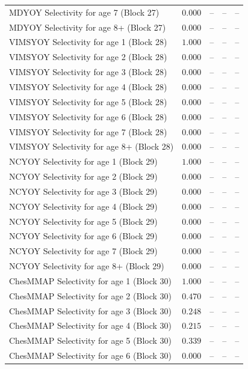 \documentclass[
]{article}
\begin{document}
\begin{landscape}
\begin{longtable}[t]{lrrrr}
\addlinespace
MDYOY Selectivity for age 7 (Block 27) & $0.000$ & -- & -- & --\\
MDYOY Selectivity for age 8+ (Block 27) & $0.000$ & -- & -- & --\\
VIMSYOY Selectivity for age 1 (Block 28) & $1.000$ & -- & -- & --\\
VIMSYOY Selectivity for age 2 (Block 28) & $0.000$ & -- & -- & --\\
VIMSYOY Selectivity for age 3 (Block 28) & $0.000$ & -- & -- & --\\
\addlinespace
VIMSYOY Selectivity for age 4 (Block 28) & $0.000$ & -- & -- & --\\
VIMSYOY Selectivity for age 5 (Block 28) & $0.000$ & -- & -- & --\\
VIMSYOY Selectivity for age 6 (Block 28) & $0.000$ & -- & -- & --\\
VIMSYOY Selectivity for age 7 (Block 28) & $0.000$ & -- & -- & --\\
VIMSYOY Selectivity for age 8+ (Block 28) & $0.000$ & -- & -- & --\\
\addlinespace
NCYOY Selectivity for age 1 (Block 29) & $1.000$ & -- & -- & --\\
NCYOY Selectivity for age 2 (Block 29) & $0.000$ & -- & -- & --\\
NCYOY Selectivity for age 3 (Block 29) & $0.000$ & -- & -- & --\\
NCYOY Selectivity for age 4 (Block 29) & $0.000$ & -- & -- & --\\
NCYOY Selectivity for age 5 (Block 29) & $0.000$ & -- & -- & --\\
\addlinespace
NCYOY Selectivity for age 6 (Block 29) & $0.000$ & -- & -- & --\\
NCYOY Selectivity for age 7 (Block 29) & $0.000$ & -- & -- & --\\
NCYOY Selectivity for age 8+ (Block 29) & $0.000$ & -- & -- & --\\
ChesMMAP Selectivity for age 1 (Block 30) & $1.000$ & -- & -- & --\\
ChesMMAP Selectivity for age 2 (Block 30) & $0.470$ & -- & -- & --\\
\addlinespace
ChesMMAP Selectivity for age 3 (Block 30) & $0.248$ & -- & -- & --\\
ChesMMAP Selectivity for age 4 (Block 30) & $0.215$ & -- & -- & --\\
ChesMMAP Selectivity for age 5 (Block 30) & $0.339$ & -- & -- & --\\
ChesMMAP Selectivity for age 6 (Block 30) & $0.000$ & -- & -- & --\\

\end{longtable}
\end{landscape}
\end{document}
